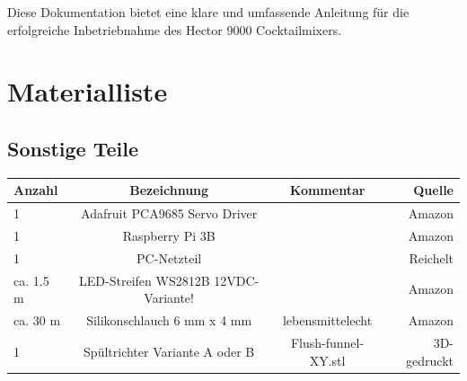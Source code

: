 \documentclass[12pt,letterpaper]{article}
\begin{document}
		Diese Dokumentation bietet eine klare und umfassende Anleitung für die erfolgreiche Inbetriebnahme des Hector 9000 Cocktailmixers.
	
	\newpage
	\raggedright
	
	
	
	\section{Materialliste}
	\subsection{Sonstige Teile}
	\begin{tabular}{|l|c|c|r|}
	\hline
	Anzahl & Bezeichnung & Kommentar & Quelle \\
	\hline
	1 & Adafruit PCA9685 Servo Driver	& &	Amazon \\
	\hline	
	1 &	Raspberry Pi 3B	& &	Amazon \\
	\hline
	1 &	PC-Netzteil	 & & Reichelt \\ 
	\hline
	ca. 1.5 m &	LED-Streifen WS2812B	12VDC-Variante! & &	Amazon \\
	\hline
	ca. 30 m	 & Silikonschlauch 6 mm x 4 mm &	lebensmittelecht & Amazon	\\
	\hline	
	1 &	Spültrichter Variante A oder B	& Flush-funnel-XY.stl &	3D-gedruckt \\
	
	\hline
	\end{tabular}
	
\end{document}
